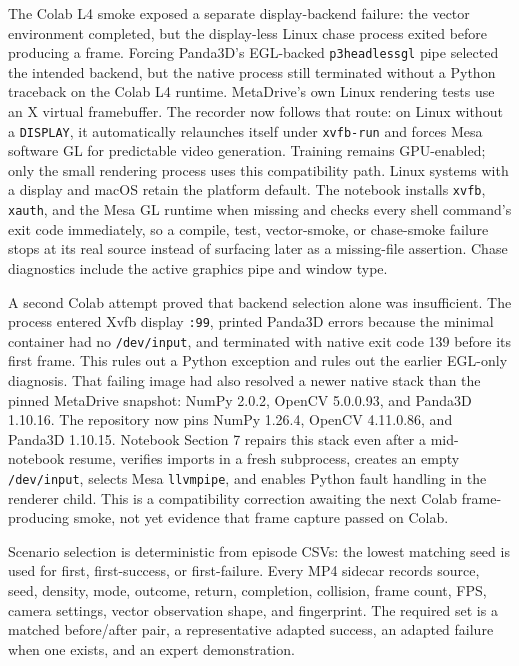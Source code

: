 \documentclass[10pt,twocolumn]{article}
\begin{document}
The Colab L4 smoke exposed a separate display-backend failure: the vector environment
completed, but the display-less Linux chase process exited before producing a frame.
Forcing Panda3D's EGL-backed \texttt{p3headlessgl} pipe selected the intended backend,
but the native process still terminated without a Python traceback on the Colab L4
runtime. MetaDrive's own Linux rendering tests use an X virtual framebuffer. The
recorder now follows that route: on Linux without a \texttt{DISPLAY}, it automatically
relaunches itself under \texttt{xvfb-run} and forces Mesa software GL for predictable
video generation. Training remains GPU-enabled; only the small rendering process uses
this compatibility path. Linux systems with a display and macOS retain the platform
default. The notebook installs \texttt{xvfb}, \texttt{xauth}, and the Mesa GL runtime
when missing and checks every shell command's exit code immediately, so a compile, test,
vector-smoke, or chase-smoke failure stops at its real source instead of surfacing later
as a missing-file assertion. Chase diagnostics include the active graphics pipe and
window type.

A second Colab attempt proved that backend selection alone was insufficient. The process
entered Xvfb display \texttt{:99}, printed Panda3D errors because the minimal container
had no \texttt{/dev/input}, and terminated with native exit code 139 before its first
frame. This rules out a Python exception and rules out the earlier EGL-only diagnosis.
That failing image had also resolved a newer native stack than the pinned MetaDrive
snapshot: NumPy 2.0.2, OpenCV 5.0.0.93, and Panda3D 1.10.16. The repository now pins
NumPy 1.26.4, OpenCV 4.11.0.86, and Panda3D 1.10.15. Notebook Section 7 repairs this
stack even after a mid-notebook resume, verifies imports in a fresh subprocess, creates
an empty \texttt{/dev/input}, selects Mesa \texttt{llvmpipe}, and enables Python fault
handling in the renderer child. This is a compatibility correction awaiting the next
Colab frame-producing smoke, not yet evidence that frame capture passed on Colab.

Scenario selection is deterministic from episode CSVs: the lowest matching seed is used
for first, first-success, or first-failure. Every MP4 sidecar records source, seed,
density, mode, outcome, return, completion, collision, frame count, FPS, camera settings,
vector observation shape, and fingerprint. The required set is a matched before/after
pair, a representative adapted success, an adapted failure when one exists, and an expert
demonstration.
\end{document}
